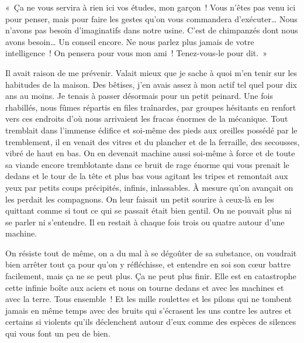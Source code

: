 {


«~Ça ne vous servira à rien ici vos études, mon garçon~! Vous n'êtes
pas venu ici pour penser, mais pour faire les gestes qu'on vous
commandera d'exécuter… Nous n'avons pas besoin d'imaginatifs dans
notre usine. C'est de chimpanzés dont nous avons besoin… Un conseil
encore. Ne nous parlez plus jamais de votre intelligence~! On pensera
pour vous mon ami~! Tenez-vous-le pour dit.~»

Il avait raison de me prévenir. Valait mieux que je sache à quoi m'en
tenir sur les habitudes de la maison. Des bêtises, j'en avais assez à
mon actif tel quel pour dix ans au moins. Je tenais à passer
désormais pour un petit peinard. Une fois rhabillés, nous fûmes
répartis en files traînardes, par groupes hésitants en renfort vers
ces endroits d'où nous arrivaient les fracas énormes de la mécanique.
Tout tremblait dans l'immense édifice et soi-même des pieds aux
oreilles possédé par le tremblement, il en venait des vitres et du
plancher et de la ferraille, des secousses, vibré de haut en bas. On
en devenait machine aussi soi-même à force et de toute sa viande
encore tremblotante dans ce bruit de rage énorme qui vous prenait le
dedans et le tour de la tête et plus bas vous agitant les tripes et
remontait aux yeux par petits coups précipités, infinis, inlassables.
À mesure qu'on avançait on les perdait les compagnons. On leur
faisait un petit sourire à ceux-là en les quittant comme si tout ce
qui se passait était bien gentil. On ne pouvait plus ni se parler ni
s'entendre. Il en restait à chaque fois trois ou quatre autour d'une
machine.

On résiste tout de même, on a du mal à se dégoûter de sa substance, on
voudrait bien arrêter tout ça pour qu'on y réfléchisse, et entendre
en soi son cœur battre facilement, mais ça ne se peut plus. Ça ne
peut plus finir. Elle est en catastrophe cette infinie boîte aux
aciers et nous on tourne dedans et avec les machines et avec la
terre. Tous ensemble~! Et les mille roulettes et les pilons qui ne
tombent jamais en même temps avec des bruits qui s'écrasent les uns
contre les autres et certains si violents qu'ils déclenchent autour
d'eux comme des espèces de silences qui vous font un peu de bien.
}

